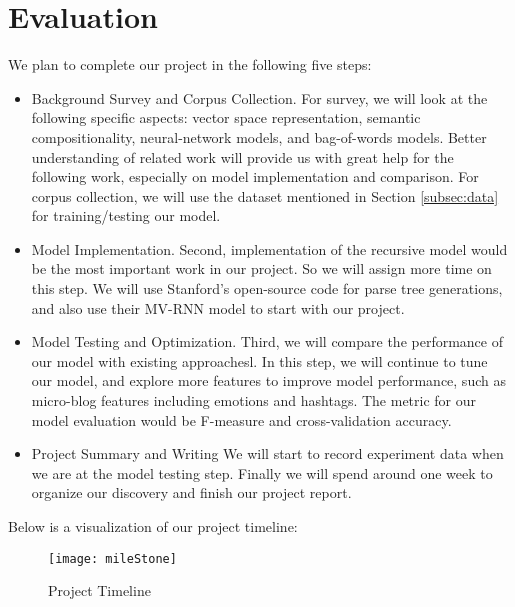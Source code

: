 \section{Evaluation}
We plan to complete our project in the following five steps:


\begin{itemize}
\item {Background Survey and Corpus Collection.}  
%
For survey, we will look at the following specific aspects: vector space representation, semantic compositionality, neural-network models, and bag-of-words models.
%
Better understanding of related work will provide us with great help for the following work, especially on model implementation and comparison. 
%
For corpus collection, we will use the dataset mentioned in Section \ref{subsec:data} for training/testing our model.
\item {Model Implementation.}
Second, implementation of the recursive model would be the most important work in our project. 
%
So we will assign more time on this step.  We will use Stanford's open-source code for parse tree generations, and also use their MV-RNN model to start with our project.

\item {Model Testing and Optimization.} 
%
Third, we will compare the performance of our model with existing approachesl.
%
In this step, we will continue to tune our model, and explore more features to improve  model performance, such as micro-blog features including emotions and hashtags.
%
The metric for our model evaluation would be  F-measure and cross-validation accuracy.

\item {Project Summary and Writing} We will start to record experiment data when we are at the model testing step. Finally we will spend around one week to organize our discovery and finish our project report.
\end{itemize}

Below is a visualization of our project timeline:
\begin{figure}[htbp]
	\centering
	\texttt{[image: mileStone]}
	\caption{Project Timeline}
	\label{fig:projecttimeline}	
\end{figure}
 

